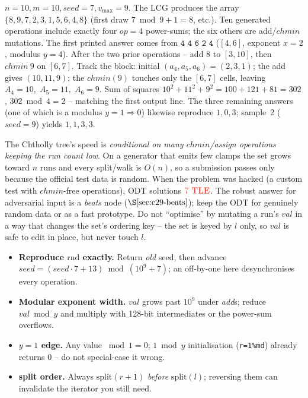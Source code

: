\begin{tracebox}[The four generated \(\mathit{op}=4\) queries of sample~\(\mathbf{1}\)]
\(n=10,m=10,\mathit{seed}=7,v_{\max}=9\).  The LCG produces the array
\(\{8,9,7,2,3,1,5,6,4,8\}\) (first draw \(7\bmod 9+1=8\), etc.).  Ten generated
operations include exactly four \(\mathit{op}=4\) power-sums; the six others are
add/\(\mathit{chmin}\) mutations.  The first printed answer comes from
\(\texttt{4 4 6 2 4}\) (\([4,6]\), exponent \(x=2\), modulus \(y=4\)).  After the
two prior operations -- add \(8\) to \([3,10]\), then \(\mathit{chmin}~9\) on
\([6,7]\).  Track the block: initial \((a_4,a_5,a_6)=(2,3,1)\); the add gives
\((10,11,9)\); the \(\mathit{chmin}(9)\) touches only the \([6,7]\) cells, leaving
\(A_4{=}10,\;A_5{=}11,\;A_6{=}9\).  Sum of
squares \(10^2{+}11^2{+}9^2=100{+}121{+}81=302\), \(302\bmod 4=\boxed{2}\) --
matching the first output line.  The three remaining answers (one of which is a
modulus \(y=1\Rightarrow 0\)) likewise reproduce \(1,0,3\); sample~2
(\(\mathit{seed}=9\)) yields \(1,1,3,3\).
\end{tracebox}

\begin{warningbox}
The Chtholly tree's speed is \emph{conditional on many \(\mathit{chmin}\)/assign
operations keeping the run count low}.  On a generator that emits few clamps the
set grows toward \(n\) runs and every split/walk is \(O(n)\), so a submission
passes only because the official test data is random.  When the problem was
hacked (a custom test with \(\mathit{chmin}\)-free operations), ODT solutions
\(\tle\).  The robust answer for adversarial input is a \emph{beats} node
(\(\secref{c29-beats}\)); keep the ODT for genuinely random data or as a fast
prototype.  Do not ``optimise'' by mutating a run's \(\mathit{val}\) in a way that
changes the set's ordering key -- the set is keyed by \(l\) only, so \(\mathit{val}\)
is safe to edit in place, but never touch \(l\).
\end{warningbox}

\begin{hardeningbox}
\begin{itemize}[nosep,leftmargin=1.4em]
  \item \textbf{Reproduce \(\mathrm{rnd}\) exactly.} Return \emph{old} seed, then
        advance \(\mathit{seed}=(\mathit{seed}\cdot7+13)\bmod(10^9{+}7)\); an
        off-by-one here desynchronises every operation.
  \item \textbf{Modular exponent width.} \(\mathit{val}\) grows past \(10^9\) under
        \emph{add}s; reduce \(\mathit{val}\bmod y\) and multiply with
        128-bit intermediates or the power-sum overflows.
  \item \textbf{\(y=1\) edge.} Any value \(\bmod 1=0\); \(1\bmod y\) initialisation
        (\texttt{r=1\%md}) already returns \(0\) -- do not special-case it wrong.
  \item \textbf{split order.} Always \(\mathrm{split}(r{+}1)\) \emph{before}
        \(\mathrm{split}(l)\); reversing them can invalidate the iterator you
        still need.
\end{itemize}
\end{hardeningbox}

